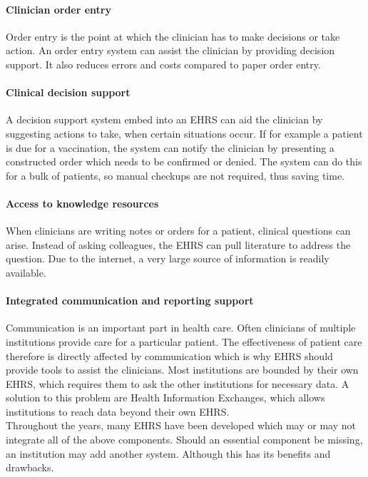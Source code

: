         \paragraph{Clinician order entry} Order entry is the point at which the clinician has to make decisions or take action. An order entry system can assist the clinician by providing decision support. It also reduces errors and costs compared to paper order entry.

        \paragraph{Clinical decision support} A decision support system embed into an EHRS can aid the clinician by suggesting actions to take, when certain situations occur. If for example a patient is due for a vaccination, the system can notify the clinician by presenting a constructed order which needs to be confirmed or denied. The system can do this for a bulk of patients, so manual checkups are not required, thus saving time.

        \paragraph{Access to knowledge resources} When clinicians are writing notes or orders for a patient, clinical questions can arise. Instead of asking colleagues, the EHRS can pull literature to address the question. Due to the internet, a very large source of information is readily available.

        \paragraph{Integrated communication and reporting support} Communication is an important part in health care. Often clinicians of multiple institutions provide care for a particular patient. The effectiveness of patient care therefore is directly affected by communication which is why EHRS should provide tools to assist the clinicians. Most institutions are bounded by their own EHRS, which requires them to ask the other institutions for necessary data. A solution to this problem are Health Information Exchanges, which allows institutions to reach data beyond their own EHRS.\\
        
        \noindent Throughout the years, many EHRS have been developed which may or may not integrate all of the above components. Should an essential component be missing, an institution may add another system. Although this has its benefits and drawbacks.


